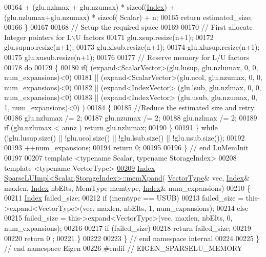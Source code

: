\begin{DoxyCode}
00164                     + (glu.nzlmax + glu.nzumax) * \textcolor{keyword}{sizeof}(\hyperlink{namespace_eigen_a62e77e0933482dafde8fe197d9a2cfde}{Index}) + (glu.nzlumax+glu.nzumax) *  \textcolor{keyword}{sizeof}(
      Scalar) + n; 
00165     \textcolor{keywordflow}{return} estimated\_size;
00166   \}
00167   
00168   \textcolor{comment}{// Setup the required space }
00169   
00170   \textcolor{comment}{// First allocate Integer pointers for L\(\backslash\)U factors}
00171   glu.xsup.resize(n+1);
00172   glu.supno.resize(n+1);
00173   glu.xlsub.resize(n+1);
00174   glu.xlusup.resize(n+1);
00175   glu.xusub.resize(n+1);
00176 
00177   \textcolor{comment}{// Reserve memory for L/U factors}
00178   \textcolor{keywordflow}{do} 
00179   \{
00180     \textcolor{keywordflow}{if}(     (expand<ScalarVector>(glu.lusup, glu.nzlumax, 0, 0, num\_expansions)<0)
00181         ||  (expand<ScalarVector>(glu.ucol,  glu.nzumax,  0, 0, num\_expansions)<0)
00182         ||  (expand<IndexVector> (glu.lsub,  glu.nzlmax,  0, 0, num\_expansions)<0)
00183         ||  (expand<IndexVector> (glu.usub,  glu.nzumax,  0, 1, num\_expansions)<0) )
00184     \{
00185       \textcolor{comment}{//Reduce the estimated size and retry}
00186       glu.nzlumax /= 2;
00187       glu.nzumax /= 2;
00188       glu.nzlmax /= 2;
00189       \textcolor{keywordflow}{if} (glu.nzlumax < annz ) \textcolor{keywordflow}{return} glu.nzlumax; 
00190     \}
00191   \} \textcolor{keywordflow}{while} (!glu.lusup.size() || !glu.ucol.size() || !glu.lsub.size() || !glu.usub.size());
00192   
00193   ++num\_expansions;
00194   \textcolor{keywordflow}{return} 0;
00195   
00196 \} \textcolor{comment}{// end LuMemInit}
00197 
00207 \textcolor{keyword}{template} <\textcolor{keyword}{typename} Scalar, \textcolor{keyword}{typename} StorageIndex>
00208 \textcolor{keyword}{template} <\textcolor{keyword}{typename} VectorType>
\hyperlink{group___sparse_l_u___module_a2a6465f1173fd8b74b2e5b8ceec53343}{00209} \hyperlink{namespace_eigen_a62e77e0933482dafde8fe197d9a2cfde}{Index} \hyperlink{group___sparse_l_u___module_a2a6465f1173fd8b74b2e5b8ceec53343}{SparseLUImpl<Scalar,StorageIndex>::memXpand}(
      \hyperlink{struct_vector_type}{VectorType}& vec, \hyperlink{namespace_eigen_a62e77e0933482dafde8fe197d9a2cfde}{Index}& maxlen, \hyperlink{namespace_eigen_a62e77e0933482dafde8fe197d9a2cfde}{Index} nbElts, MemType memtype, 
      \hyperlink{namespace_eigen_a62e77e0933482dafde8fe197d9a2cfde}{Index}& num\_expansions)
00210 \{
00211   \hyperlink{namespace_eigen_a62e77e0933482dafde8fe197d9a2cfde}{Index} failed\_size; 
00212   \textcolor{keywordflow}{if} (memtype == USUB)
00213      failed\_size = this->expand<VectorType>(vec, maxlen, nbElts, 1, num\_expansions);
00214   \textcolor{keywordflow}{else}
00215     failed\_size = this->expand<VectorType>(vec, maxlen, nbElts, 0, num\_expansions);
00216 
00217   \textcolor{keywordflow}{if} (failed\_size)
00218     \textcolor{keywordflow}{return} failed\_size; 
00219   
00220   \textcolor{keywordflow}{return} 0 ;  
00221 \}
00222 
00223 \} \textcolor{comment}{// end namespace internal}
00224 
00225 \} \textcolor{comment}{// end namespace Eigen}
00226 \textcolor{preprocessor}{#endif // EIGEN\_SPARSELU\_MEMORY}
\end{DoxyCode}
